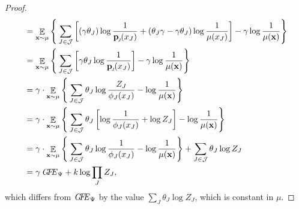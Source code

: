 \documentclass[letterpaper]{article} %
\theoremstyle{plain}
\theoremstyle{definition}
\theoremstyle{remark}
\DeclareMathOperator*{\Ex}{\mathbb{E}} %
\newcommand\mat[1]{\mathbf{#1}}
\newcommand{\bp}[1][L]{\mat{p}_{\!_{#1}\!}}
\newcommand\GFE{\mathit{G\mkern-4mu F\mkern-4.5mu E}}
\begin{document}
\begin{proof}
\begin{align*}
		 &= \Ex_{ \mat x \sim \mu} \Bigg\{   \sum_{ J \in \mathcal J } \left[
	 		(\gamma\theta_J) \log \frac{1}{ \bp[J](x_J) } + 
	 			(\theta_J \gamma - \gamma\theta_J)
	 		 \log \frac{1}{\mu(x_J)} \right] - \gamma \log \frac{1}{\mu(\mat x)} \Bigg\} \\
		&= \Ex_{ \mat x \sim \mu} \Bigg\{  \sum_{ J \in \mathcal J }\left[
			\gamma\theta_J \log \frac{1}{\bp[J](x_J)}  \right] - \gamma \log \frac{1}{\mu(\mat x)} \Bigg\} 
			\\
		&= \gamma \cdot \Ex_{\mat x \sim \mu} \Bigg\{  \sum_{ J \in \mathcal J } \theta_J
			\log \frac{Z_J}{\phi_J(x_J)}   -\log \frac{1}{\mu(\mat x)} \Bigg\} \\
		&= \gamma \cdot \Ex_{\mat x \sim \mu} \Bigg\{  \sum_{ J \in \mathcal J } \theta_J \left[
			\log \frac{1}{\phi_J(x_J)} + \log Z_J \right]  - \log \frac{1}{\mu(\mat x)} \Bigg\} \\
		&= \gamma \cdot \Ex_{\mat x \sim \mu} \Bigg\{  \sum_{ J \in \mathcal J } \theta_J 
			\log \frac{1}{\phi_J(x_J)}  - \log \frac{1}{\mu(\mat x)} \Bigg\}
			 +  \sum_{J \in \mathcal J} \theta_J \log Z_J  \\
        	&= \gamma\, \GFE_{\Psi} + k \log \prod_{J} Z_J,
	\end{align*}
which differs from $\GFE_{\Psi}$ by the value $\sum_J \theta_J \log Z_J$, which 
is constant in $\mu$.

\end{proof}
\fi
\end{document}
